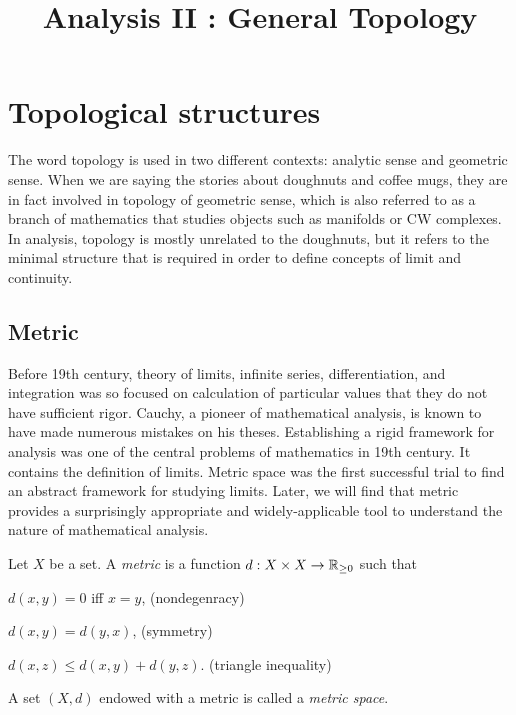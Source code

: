 \documentclass{../crs}
\title{Analysis II : General Topology}
\begin{document}
\maketitle
\tableofcontents








\chapter{Topological structures}

The word topology is used in two different contexts: analytic sense and geometric sense.
When we are saying the stories about doughnuts and coffee mugs, they are in fact involved in topology of geometric sense, which is also referred to as a branch of mathematics that studies objects such as manifolds or CW complexes.
In analysis, topology is mostly unrelated to the doughnuts, but it refers to the minimal structure that is required in order to define concepts of limit and continuity. %






\section{Metric}

Before 19th century, theory of limits, infinite series, differentiation, and integration was so focused on calculation of particular values that they do not have sufficient rigor.
Cauchy, a pioneer of mathematical analysis, is known to have made numerous mistakes on his theses.
Establishing a rigid framework for analysis was one of the central problems of mathematics in 19th century.
It contains the definition of limits.
Metric space was the first successful trial to find an abstract framework for studying limits.
Later, we will find that metric provides a surprisingly appropriate and widely-applicable tool to understand the nature of mathematical analysis.

\begin{defn}
Let $X$ be a set.
A \emph{metric} is a function $d:X\x X\to\R_{\ge0}$ such that
\begin{cond}
\item $d(x,y)=0$ iff $x=y$, \hfill(nondegenracy)
\item $d(x,y)=d(y,x)$, \hfill(symmetry)
\item $d(x,z)\le d(x,y)+d(y,z)$. \hfill(triangle inequality)
\end{cond}
A set $(X,d)$ endowed with a metric is called a \emph{metric space}.
\end{defn}
\end{document}
